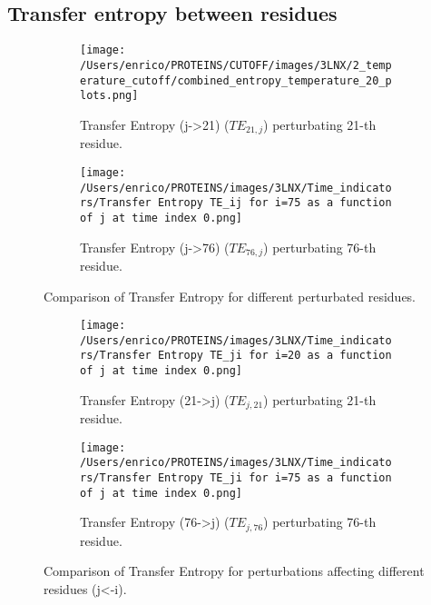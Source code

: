 \documentclass[English, Lau, oneside]{sapthesis}
\begin{document}
\subsection{Transfer entropy between residues}
\begin{figure}[h!]
    \centering
    \begin{subfigure}[t]{0.48\textwidth}
        \centering
        \texttt{[image: /Users/enrico/PROTEINS/CUTOFF/images/3LNX/2\_temperature\_cutoff/combined\_entropy\_temperature\_20\_plots.png]}
        \caption{Transfer Entropy (j->21) ($TE_{21,j}$) perturbating 21-th residue.}
        \label{fig:TE21_i_j_out}
    \end{subfigure}
    \hfill
    \begin{subfigure}[t]{0.48\textwidth}
        \centering
        \texttt{[image: /Users/enrico/PROTEINS/images/3LNX/Time\_indicators/Transfer Entropy TE\_ij for i=75 as a function of j at time index 0.png]}
        \caption{Transfer Entropy (j->76) ($TE_{76,j}$) perturbating 76-th residue.}
        \label{fig:TE76_i_j_out}
    \end{subfigure}
    \caption{Comparison of Transfer Entropy for different perturbated residues.}
    \label{fig:TE_comparison_i_j_out}
\end{figure}

\begin{figure}[h!]
    \centering
    \begin{subfigure}[t]{0.48\textwidth}
        \centering
        \texttt{[image: /Users/enrico/PROTEINS/images/3LNX/Time\_indicators/Transfer Entropy TE\_ji for i=20 as a function of j at time index 0.png]}
        \caption{Transfer Entropy (21->j) ($TE_{j,21}$) perturbating 21-th residue.}
        \label{fig:TE21_j_i}
    \end{subfigure}
    \hfill
    \begin{subfigure}[t]{0.48\textwidth}
        \centering
        \texttt{[image: /Users/enrico/PROTEINS/images/3LNX/Time\_indicators/Transfer Entropy TE\_ji for i=75 as a function of j at time index 0.png]}
        \caption{Transfer Entropy (76->j) ($TE_{j,76}$) perturbating 76-th residue.}
        \label{fig:TE76_j_i}
    \end{subfigure}
    \caption{Comparison of Transfer Entropy for perturbations affecting different residues (j<-i).}
    \label{fig:TE_comparison_j_i}
\end{figure}
\end{document}

